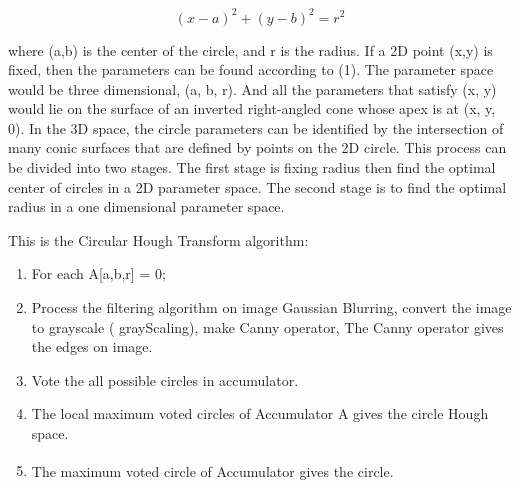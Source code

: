 \begin{equation}
    (x - a)^2 + (y - b)^2 = r^2
\end{equation}

where (a,b) is the center of the circle, and r is the radius. If a 2D point (x,y) is fixed, then the parameters can be found according to (1). The parameter space would be three dimensional, (a, b, r). And all the parameters that satisfy (x, y) would lie on the surface of an inverted right-angled cone whose apex is at (x, y, 0). In the 3D space, the circle parameters can be identified by the intersection of many conic surfaces that are defined by points on the 2D circle. This process can be divided into two stages. The first stage is fixing radius then find the optimal center of circles in a 2D parameter space. The second stage is to find the optimal radius in a one dimensional parameter space.

This is the Circular Hough Transform algorithm:

\begin{enumerate}
    \item For each A[a,b,r] = 0;
    \item Process the filtering algorithm on image Gaussian Blurring, convert the image to grayscale ( grayScaling), make Canny operator, The Canny operator gives the edges on image.
    \item Vote the all possible circles in accumulator.
    \item The local maximum voted circles of Accumulator A gives the circle Hough space.
    \item The maximum voted circle of Accumulator gives the circle. \textsuperscript{\cite{circle-hough-transform}}
\end{enumerate}

\newpage
